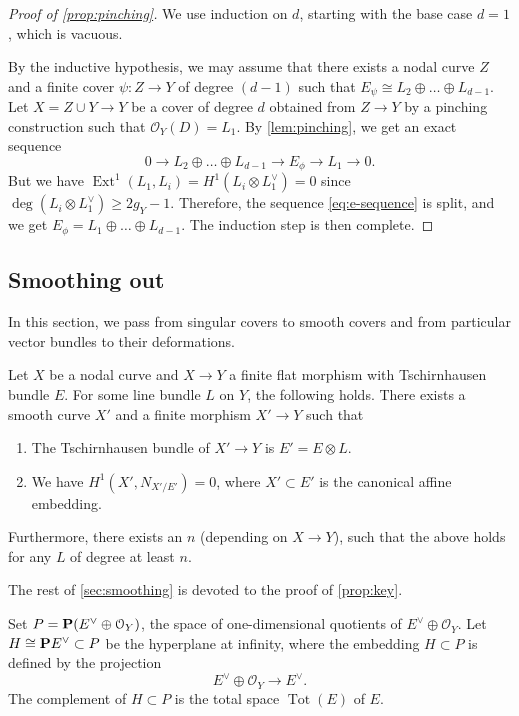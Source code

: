 \documentclass[11 pt]{amsart}
\DeclareMathOperator{\Tot}{Tot}
\renewcommand{\O}{{\mathcal O}}
\renewcommand {\P}{{\bf P}}
\providecommand {\from}{{\colon}}
\providecommand{\Ext}{\operatorname{Ext}}
\numberwithin{equation}{section}
\begin{document}
\begin{proof}[Proof of \autoref{prop:pinching}]
  We use induction on $d$, starting with the base case $d = 1$, which is vacuous.

  By the inductive hypothesis, we may assume that there exists a nodal curve $Z$ and a finite cover $\psi \from Z \to Y$ of degree $(d-1)$ such that $E_\psi \cong L_2 \oplus \dots \oplus L_{d-1}$.
  Let $X = Z \cup Y \to Y$ be a cover of degree $d$ obtained from $Z \to Y$ by a pinching construction such that $\O_Y(D) = L_1$.
  By \autoref{lem:pinching}, we get an exact sequence
  \begin{equation}\label{eq:e-sequence}
    0 \to L_2 \oplus \dots \oplus L_{d-1} \to E_\phi \to L_1 \to 0.
  \end{equation}
  But we have $\Ext^1(L_1, L_i) = H^1(L_i \otimes L_{1}^{\vee}) = 0$ since $\deg (L_i \otimes L_{1}^{\vee}) \geq 2g_Y-1$.
  Therefore, the sequence \eqref{eq:e-sequence} is split, and we get $E_\phi = L_1 \oplus \dots \oplus L_{d-1}$.
  The induction step is then complete.  
\end{proof}

\subsection{Smoothing out}
\label{sec:smoothing}
In this section, we pass from singular covers to smooth covers and from particular vector bundles to their deformations.

\begin{proposition}[Key]
  \label{prop:key}
  Let $X$ be a nodal curve and $X \to Y$ a finite flat morphism with Tschirnhausen bundle $E$.
  For some line bundle $L$ on $Y$, the following holds.
  There exists a smooth curve $X'$ and a finite morphism $X' \to Y$ such that
  \begin{enumerate}
  \item The Tschirnhausen bundle of $X' \to Y$ is $E' = E \otimes L$.
  \item We have $H^1(X', N_{X'/ E'}) = 0$, where $X' \subset E'$ is the canonical affine embedding.
  \end{enumerate}
  Furthermore, there exists an $n$ (depending on $X \to Y$), such that the above holds for any $L$ of degree at least $n$.
\end{proposition}
The rest of \autoref{sec:smoothing} is devoted to the proof of \autoref{prop:key}.

Set $P = \P(E^\vee \oplus \O_Y)$, the space of one-dimensional quotients of $E^\vee \oplus \O_Y$.
Let $H \cong \P E^\vee \subset P$ be the hyperplane at infinity, where the embedding $ H \subset P$ is defined by the projection \[E^\vee \oplus \O_Y \to E^\vee.\]
The complement of $H \subset P$ is the total space $\Tot(E)$ of $E$.
\end{document}
